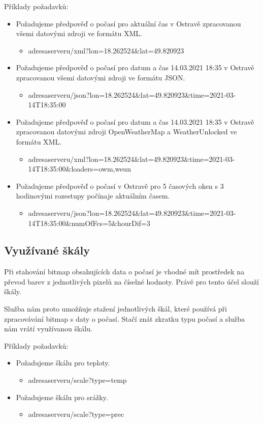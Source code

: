 \documentclass[czech,bachelor,dept460,male,csharp,cpdeclaration]{diploma}
\begin{document}
	Příklady požadavků:
	\begin{itemize}
		\item Požadujeme předpověď o počasí pro aktuální čas v Ostravě zpracovanou všemi datovými zdroji ve formátu XML.
		\begin{itemize}
			\item adresaserveru/xml?lon=18.262524\&lat=49.820923
		\end{itemize}	
		\item Požadujeme předpověď o počasí pro datum a čas 14.03.2021 18:35 v Ostravě zpracovanou všemi datovými zdroji ve formátu JSON.
		\begin{itemize}
			\item adresaserveru/json?lon=18.262524\&lat=49.820923\&time=2021-03-14T18:35:00
		\end{itemize}
		\item Požadujeme předpověď o počasí pro datum a čas 14.03.2021 18:35 v Ostravě zpracovanou datovými zdroji OpenWeatherMap a WeatherUnlocked ve formátu XML.
		\begin{itemize}
			\item adresaserveru/xml?lon=18.262524\&lat=49.820923\&time=2021-03-14T18:35:00\&loaders=owm,weun
		\end{itemize}
		\item Požadujeme předpověď o počasí v Ostravě pro 5 časových oken s 3 hodinovými rozestupy počínaje aktuálním časem.
		\begin{itemize}
			\item adresaserveru/json?lon=18.262524\&lat=49.820923\&time=2021-03-14T18:35:00\&numOfFcs=5\&hourDif=3
		\end{itemize}
	\end{itemize}
	
	\subsection{Využívané škály}
	
	Při stahování bitmap obsahujících data o počasí je vhodné mít prostředek na převod barev z jednotlivých pixelů na číselné hodnoty. Právě pro tento účel slouží škály.
	
	Služba nám proto umožňuje stažení jednotlivých škál, které používá při zpracovávání bitmap s daty o počasí. Stačí znát zkratku typu počasí a služba nám vrátí využívanou škálu.
	
	Příklady požadavků:
	\begin{itemize}
		\item Požadujeme škálu pro teploty.
		\begin{itemize}
			\item adresaserveru/scale?type=temp
		\end{itemize}
		\item Požadujeme škálu pro srážky.
		\begin{itemize}
			\item adresaserveru/scale?type=prec
		\end{itemize}
	\end{itemize}
	
\end{document}
